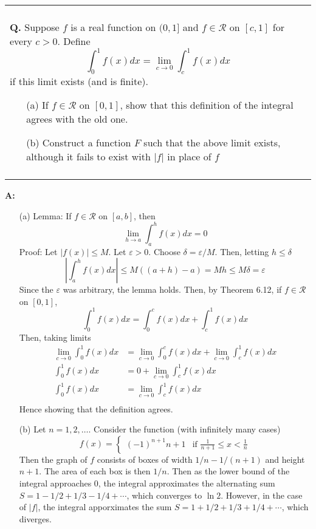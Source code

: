 \documentclass{article}
\newenvironment{myboxed}{\noindent\begin{tabular}{|p{.975\textwidth}|}\hline \\}{\\\\\hline\end{tabular}}
\newcounter{Question}
\newenvironment{Question} 
{\bigskip\begin{myboxed}\refstepcounter{Question}\par\noindent\textbf{Q\theQuestion.}}
{\end{myboxed}\bigskip}
\newenvironment{Answer} {\par\noindent\textbf{A:}} {}
\begin{document}
\newpage
\begin{Question}
    Suppose $f$ is a real function on $(0, 1]$ and $f \in \mathscr{R}$ on $[c,1]$ for every $c > 0$. Define
    \[\int_0^1 f(x) dx = \lim_{c\to 0} \int_c^1 f(x)dx\]
    if this limit exists (and is finite).
    \begin{itemize}
        \item[(a)] If $f \in \mathscr{R}$ on $[0, 1]$, show that this definition of the integral agrees with the old one.
        \item[(b)] Construct a function $F$ such that the above limit exists, although it fails to exist with $|f|$ in place of $f$
    \end{itemize}
\end{Question}
\begin{Answer}
    \begin{itemize}
        \item[(a)]
            Lemma: If $f \in \mathscr{R}$ on $[a ,b]$, then
            \[\lim_{h \to a} \int_a^h f(x)dx = 0\]
            Proof: Let $|f(x)| \leq M$. Let $\varepsilon > 0$. Choose $\delta = \varepsilon/M$. Then, letting $h \leq \delta$
            \[\left|\int_a^h f(x) dx\right| \leq M((a+h) - a) = Mh \leq M\delta = \varepsilon\]
            Since the $\varepsilon$ was arbitrary, the lemma holds.
            Then, by Theorem 6.12, if $f \in \mathscr{R}$ on $[0, 1]$,
            \[\int_0^1 f(x)dx = \int_0^c f(x)dx + \int_c^1 f(x)dx\]
            Then, taking limits
            \begin{align*}
                \lim_{c \to 0} \int_0^1 f(x)dx &= \lim_{c \to 0}\int_0^c f(x)dx + \lim_{c \to 0}\int_c^1 f(x)dx \\
                \int_0^1 f(x)dx &= 0 + \lim_{c \to 0}\int_c^1 f(x)dx \\
                \int_0^1 f(x)dx &= \lim_{c \to 0}\int_c^1 f(x)dx \\
            \end{align*}
            Hence showing that the definition agrees.
        \item[(b)]
            Let $n = 1, 2, \ldots$. Consider the function (with infinitely many cases)
            \[f(x) = \begin{cases}
                (-1)^{n+1}n+1 & \text{if } \frac{1}{n+1} \leq x < \frac{1}{n}
            \end{cases}\]
            Then the graph of $f$ consists of boxes of width $1/n - 1/(n+1)$ and height $n+1$. The area of each box is then $1/n$. Then as the lower bound of the integral approaches $0$, the integral approximates the alternating sum $S = 1 - 1/2 + 1/3 - 1/4 + \cdots$, which converges to $\ln 2$.
            However, in the case of $|f|$, the integral apporximates the sum $S = 1 + 1/2 + 1/3 + 1/4 + \cdots$, which diverges.
    \end{itemize}
\end{Answer}
\end{document}
